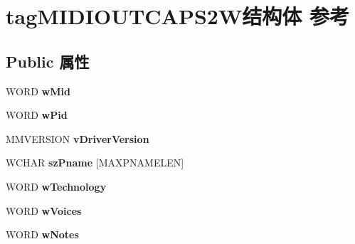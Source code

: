 \hypertarget{structtag_m_i_d_i_o_u_t_c_a_p_s2_w}{}\section{tag\+M\+I\+D\+I\+O\+U\+T\+C\+A\+P\+S2\+W结构体 参考}
\label{structtag_m_i_d_i_o_u_t_c_a_p_s2_w}
\subsection*{Public 属性}
\begin{DoxyCompactItemize}
\item 
\mbox{\label{structtag_m_i_d_i_o_u_t_c_a_p_s2_w_aed8078830e122756f8b2b1af1cdb395d}} 
W\+O\+RD {\bfseries w\+Mid}
\item 
\mbox{\label{structtag_m_i_d_i_o_u_t_c_a_p_s2_w_accbc3c4daa7463b846959260b0350d89}} 
W\+O\+RD {\bfseries w\+Pid}
\item 
\mbox{\label{structtag_m_i_d_i_o_u_t_c_a_p_s2_w_a81910475ad2152d6ef490836505550ef}} 
M\+M\+V\+E\+R\+S\+I\+ON {\bfseries v\+Driver\+Version}
\item 
\mbox{\label{structtag_m_i_d_i_o_u_t_c_a_p_s2_w_a6c83654848891df47b7b7efea45ff8f7}} 
W\+C\+H\+AR {\bfseries sz\+Pname} \mbox{[}M\+A\+X\+P\+N\+A\+M\+E\+L\+EN\mbox{]}
\item 
\mbox{\label{structtag_m_i_d_i_o_u_t_c_a_p_s2_w_a2fe1636becf1b3e4bac6ba1ea31488eb}} 
W\+O\+RD {\bfseries w\+Technology}
\item 
\mbox{\label{structtag_m_i_d_i_o_u_t_c_a_p_s2_w_a6f57a9205b798fac98f4ef1523ec232d}} 
W\+O\+RD {\bfseries w\+Voices}
\item 
\mbox{\label{structtag_m_i_d_i_o_u_t_c_a_p_s2_w_a5871007090c0c66be1f2445d349ea0cb}} 
W\+O\+RD {\bfseries w\+Notes}
\item 
\mbox{\label{structtag_m_i_d_i_o_u_t_c_a_p_s2_w_a258521bc4df82b7c67e4b9a84fe0ccdd}} 

\end{DoxyCompactItemize}
